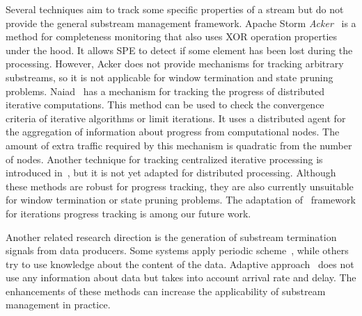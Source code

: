Several techniques aim to track some specific properties of a stream but do not provide the general substream management framework. Apache Storm {\em Acker}~\cite{apache:storm:acker} is a method for completeness monitoring that also uses XOR operation properties under the hood. It allows SPE to detect if some element has been lost during the processing. However, Acker does not provide mechanisms for tracking arbitrary substreams, so it is not applicable for window termination and state pruning problems. Naiad~\cite{Murray:2013:NTD:2517349.2522738} has a mechanism for tracking the progress of distributed iterative computations. This method can be used to check the convergence criteria of iterative algorithms or limit iterations. It uses a distributed agent for the aggregation of information about progress from computational nodes. The amount of extra traffic required by this mechanism is quadratic from the number of nodes. Another technique for tracking centralized iterative processing is introduced in~\cite{chandramouli2014trill}, but it is not yet adapted for distributed processing. Although these methods are robust for progress tracking, they are also currently unsuitable for window termination or state pruning problems. The adaptation of \tracker\ framework for iterations progress tracking is among our future work.

Another related research direction is the generation of substream termination signals from data producers. Some systems apply periodic scheme~\cite{Akidau:2013:MFS:2536222.2536229, Akidau:2015:DMP:2824032.2824076}, while others try to use knowledge about the content of the data. Adaptive approach~\cite{awad2019adaptive} does not use any information about data but takes into account arrival rate and delay. The enhancements of these methods can increase the applicability of substream management in practice.


